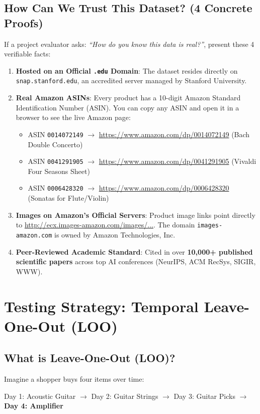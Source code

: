 \documentclass[11pt,a4paper]{article}
\begin{document}
\subsection{How Can We Trust This Dataset? (4 Concrete Proofs)}
If a project evaluator asks: \textit{``How do you know this data is real?''}, present these 4 verifiable facts:
\begin{enumerate}
    \item \textbf{Hosted on an Official \texttt{.edu} Domain}: The dataset resides directly on \texttt{snap.stanford.edu}, an accredited server managed by Stanford University.
    \item \textbf{Real Amazon ASINs}: Every product has a 10-digit Amazon Standard Identification Number (ASIN). You can copy any ASIN and open it in a browser to see the live Amazon page:
    \begin{itemize}[noitemsep]
        \item ASIN \texttt{0014072149} $\to$ \url{https://www.amazon.com/dp/0014072149} (Bach Double Concerto)
        \item ASIN \texttt{0041291905} $\to$ \url{https://www.amazon.com/dp/0041291905} (Vivaldi Four Seasons Sheet)
        \item ASIN \texttt{0006428320} $\to$ \url{https://www.amazon.com/dp/0006428320} (Sonatas for Flute/Violin)
    \end{itemize}
    \item \textbf{Images on Amazon's Official Servers}: Product image links point directly to \url{http://ecx.images-amazon.com/images/...}. The domain \texttt{images-amazon.com} is owned by Amazon Technologies, Inc.
    \item \textbf{Peer-Reviewed Academic Standard}: Cited in over \textbf{10,000+ published scientific papers} across top AI conferences (NeurIPS, ACM RecSys, SIGIR, WWW).
\end{enumerate}

\section{Testing Strategy: Temporal Leave-One-Out (LOO)}

\subsection{What is Leave-One-Out (LOO)?}
Imagine a shopper buys four items over time:
\begin{center}
Day 1: Acoustic Guitar $\longrightarrow$ Day 2: Guitar Strings $\longrightarrow$ Day 3: Guitar Picks $\longrightarrow$ \textbf{Day 4: Amplifier}
\end{center}
\end{document}
